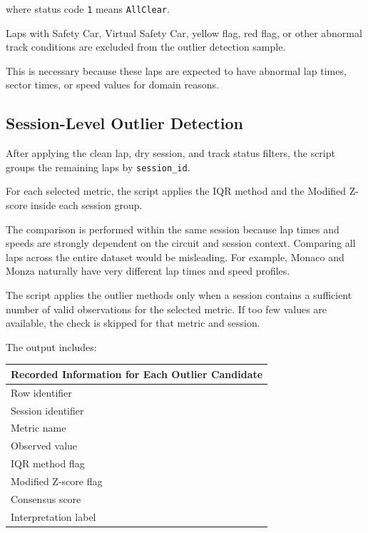 \documentclass[a4paper,11pt]{article}
\begin{document}
	where status code \texttt{1} means \texttt{AllClear}.
	
	Laps with Safety Car, Virtual Safety Car, yellow flag, red flag, or other abnormal
	track conditions are excluded from the outlier detection sample.
	
	This is necessary because these laps are expected to have abnormal lap times, sector
	times, or speed values for domain reasons.
	
	\subsection{Session-Level Outlier Detection}
	
	After applying the clean lap, dry session, and track status filters, the script groups
	the remaining laps by \texttt{session\_id}.
	
	For each selected metric, the script applies the IQR method and the Modified Z-score
	inside each session group.
	
	The comparison is performed within the same session because lap times and speeds are
	strongly dependent on the circuit and session context. Comparing all laps across the
	entire dataset would be misleading. For example, Monaco and Monza naturally have very
	different lap times and speed profiles.
	
	The script applies the outlier methods only when a session contains a sufficient number
	of valid observations for the selected metric. If too few values are available, the
	check is skipped for that metric and session.
	
	The output includes:
	
	\begin{table}[H]
		\centering
		\small
		\begin{tabular}{p{12cm}}
			\toprule
			\textbf{Recorded Information for Each Outlier Candidate} \\
			\midrule
			Row identifier \\[0.1cm]
			Session identifier \\[0.1cm]
			Metric name \\[0.1cm]
			Observed value \\[0.1cm]
			IQR method flag \\[0.1cm]
			Modified Z-score flag \\[0.1cm]
			Consensus score \\[0.1cm]
			Interpretation label \\
			\bottomrule
		\end{tabular}
	\end{table}
	
\end{document}
